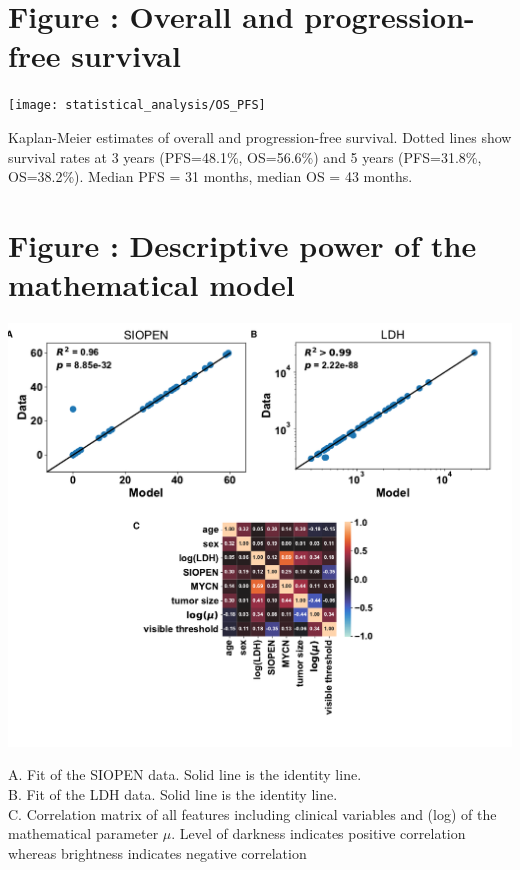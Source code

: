 \documentclass[11pt]{article}
\newcounter{fignb}  %
\begin{document}
\section{Figure : Overall and progression-free survival}
\spaceV
\begin{center}
\texttt{[image: statistical\_analysis/OS\_PFS]}
\end{center}
Kaplan-Meier estimates of overall and progression-free survival. Dotted lines show survival rates at 3 years (PFS=48.1\%, OS=56.6\%) and 5 years (PFS=31.8\%, OS=38.2\%). Median PFS = 31 months, median OS = 43 months.
\newpage
{}
\section{Figure : Descriptive power of the mathematical model}
\spaceV
\begin{center}
\includegraphics[width=1\textwidth]{figure_3}
\end{center}

A. Fit of the SIOPEN data. Solid line is the identity line.\\
B. Fit of the LDH data. Solid line is the identity line.\\
C. Correlation matrix of all features including clinical variables and (log) of the mathematical parameter $\mu$. Level of darkness indicates positive correlation whereas brightness indicates negative correlation
\end{document}
